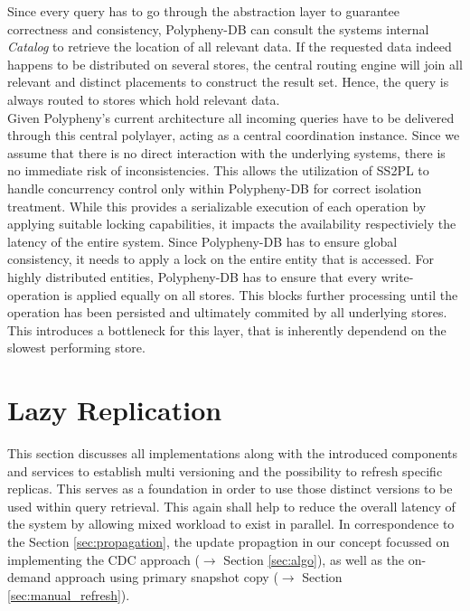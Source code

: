 Since every query has to go through the abstraction layer to guarantee correctness 
and consistency, Polypheny-DB can consult the systems internal \textit{Catalog} to retrieve the
location of all relevant data. 
If the requested data indeed happens to be distributed on several stores, the central routing engine will join all relevant and distinct 
placements to construct the result set. Hence, the query is always routed to stores which hold relevant data.\\


Given Polypheny's current architecture all incoming queries have to be delivered through this central polylayer, acting as a central coordination instance.
Since we assume that there is no direct interaction with the underlying systems, there is no immediate risk of inconsistencies. 
This allows the utilization of SS2PL to handle concurrency control only within Polypheny-DB for correct isolation treatment.
While this provides a serializable execution of each operation by applying suitable locking capabilities, it impacts the availability respectiviely the latency of the entire system.
Since Polypheny-DB has to ensure global consistency, it needs to apply a lock on the entire entity that is accessed. 
For highly distributed entities, Polypheny-DB has to ensure that every write-operation is applied equally on all stores.
This blocks further processing until the operation has been persisted and ultimately commited by all underlying stores.
This introduces a bottleneck for this layer, that is inherently dependend on the slowest performing store.









\section{Lazy Replication}
\label{sec:lazy_replication}

This section discusses all implementations along with the introduced components and services to establish 
multi versioning and the possibility to refresh specific replicas. This serves as a foundation in order to use those distinct versions
to be used within query retrieval. This again shall help to reduce the overall latency of the system by allowing mixed workload to exist in parallel.
In correspondence to the Section \ref{sec:propagation}, the update propagtion in our concept focussed on implementing the CDC approach ($\rightarrow$ Section \ref{sec:algo}), 
as well as the on-demand approach using primary snapshot copy ($\rightarrow$ Section \ref{sec:manual_refresh}).



